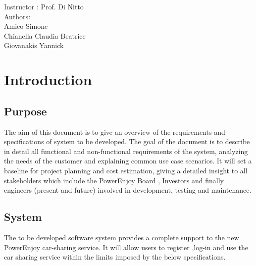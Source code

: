\documentclass[12pt]{article}
\begin{document}
	\begin{center}
	 	{\Large Instructor : Prof. Di Nitto}
	 	 \vspace{5mm}\\	 
	 	{\Large Authors:}\\
	 	{\Large Amico Simone}\\
	 	{\Large Chianella Claudia Beatrice}\\
	 	{\Large Giovanakis Yannick}
	\end{center}
	 
	\newpage
	
	
	\tableofcontents{}
	 
	\newpage
	 
	\section{\Large Introduction}
	 
	 \subsection{Purpose}
		The aim of this document	is to give an overview of the requirements and 			
		specifications of system to be developed. 
		The goal of the document is to describe in detail all functional and non-functional 
		requirements of the system, analyzing the needs of the customer and explaining common 
		use case scenarios.
		It will set a baseline for project planning and cost estimation, giving a detailed 
		insight to all stakeholders which include the PowerEnjoy Board , Investors and finally
	    engineers (present and future) involved  in development, testing and maintenance.
		
	 \subsection{System}
	 	The to be developed software system provides a complete support to the new PowerEnjoy 	
	 	car-sharing service. It will allow users to register ,log-in and use the car sharing 
	 	service within the limits imposed by the below specifications.
	 
	
\end{document}
